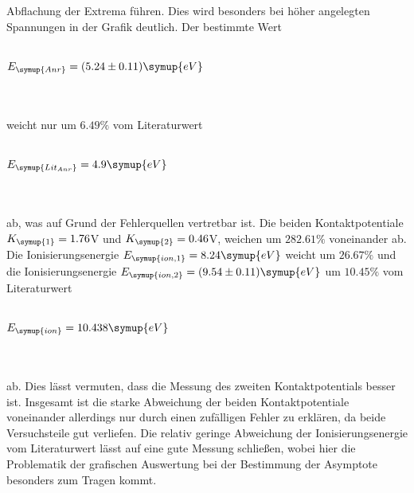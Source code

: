 Abflachung der Extrema führen. Dies wird besonders bei höher angelegten Spannungen in der Grafik deutlich. Der bestimmte Wert
\\ \\
    \centerline{$E_{\symup{Anr}} = (5.24 \pm 0.11) \symup{eV}$} 
\\ \\
weicht nur um $6.49\%$ vom Literaturwert     
\\ \\
\centerline{$E_{\symup{Lit_{Anr}}} = 4.9 \symup{eV}$\cite{anr}} 
\\ \\
ab, was auf Grund der Fehlerquellen vertretbar ist.
Die beiden Kontaktpotentiale $K_{\symup{1}} = 1.76$V und $K_{\symup{2}} = 0.46$V, weichen um $282.61 \%$ voneinander ab.
Die Ionisierungsenergie $E_{\symup{ion, 1}} = 8.24 \symup{eV}$ weicht um $26.67 \%$ und die Ionisierungsenergie 
$E_{\symup{ion, 2}} = (9.54 \pm 0.11) \symup{eV}$ um $10.45 \%$ vom Literaturwert
\\ \\
    \centerline{$E_{\symup{ion}} = 10.438 \symup{eV}$  \cite{ion}}
\\ \\
ab. Dies lässt vermuten, dass die Messung des zweiten Kontaktpotentials besser ist. Insgesamt ist die starke Abweichung der beiden 
Kontaktpotentiale voneinander allerdings nur durch einen zufälligen Fehler zu erklären, da beide Versuchsteile gut verliefen. 
Die relativ geringe Abweichung der Ionisierungsenergie vom Literaturwert lässt auf eine gute Messung schließen, wobei hier die 
Problematik der grafischen Auswertung bei der Bestimmung der Asymptote besonders zum Tragen kommt.  


